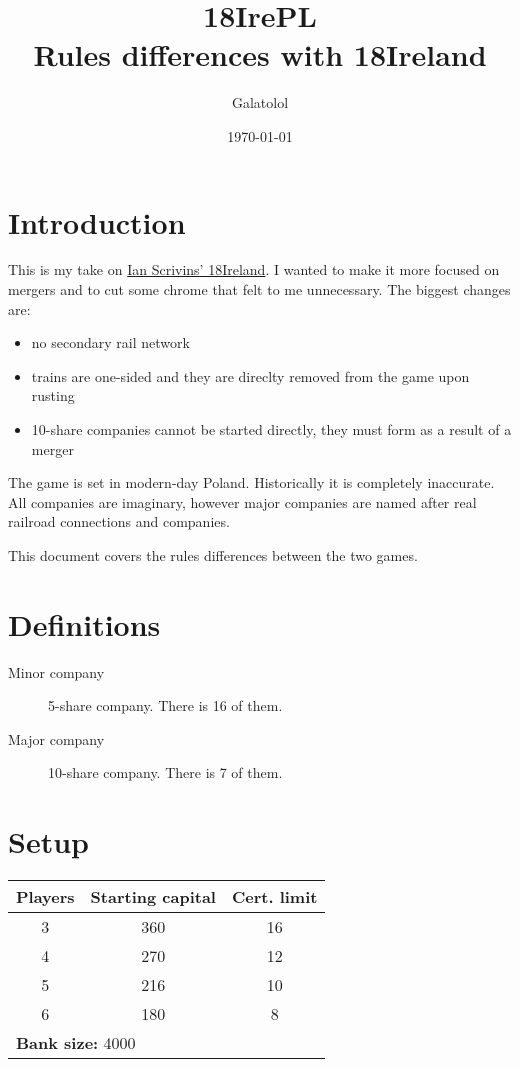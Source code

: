 \documentclass[10pt,a4paper,twocolumn]{article}
\title{18IrePL\\ \large{Rules differences with 18Ireland}}
\author{Galatolol}
\date{\today}
\begin{document}
\maketitle

\section{Introduction}
This is my take on \href{https://boardgamegeek.com/boardgame/196217/18ireland}{Ian Scrivins' 18Ireland}. I wanted to make it more focused on mergers and to cut some chrome that felt to me unnecessary. The biggest changes are: 
\begin{itemize}
\item no secondary rail network
\item trains are one-sided and they are direclty removed from the game upon rusting
\item 10-share companies cannot be started directly, they must form as a result of a merger
\end{itemize}

The game is set in modern-day Poland. Historically it is completely inaccurate. All companies are imaginary, however major companies are named after real railroad connections and companies.

This document covers the rules differences between the two games.



\section{Definitions}
\begin{description}
	\item [Minor company] 5-share company. There is 16 of them.
	\item [Major company] 10-share company. There is 7 of them.
\end{description}

\section{Setup}

\begin{center}
  \begin{tabular}{ | c | c | c | }
    \hline
    \textbf{Players} & \textbf{Starting capital} & \textbf{Cert. limit} \\ \hline
    3 & 360 & 16 \\ \hline
    4 & 270 & 12 \\ \hline
    5 & 216 & 10 \\ \hline
    6 & 180 & 8 \\ 
    \hline
      \multicolumn{3}{|l|}{\textbf{Bank size:} 4000} \\
 	\hline

  \end{tabular}
\end{center}
\end{document}
